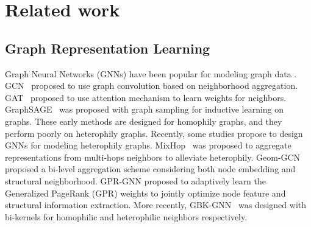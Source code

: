 \documentclass[sigconf]{acmart}
\begin{document}
	\section{Related work}
	\subsection{Graph Representation Learning}
	Graph Neural Networks (GNNs) have been popular for modeling graph data \cite{bi2022mm,yang2021domain,chen2021fast,wang2019tag2gauss,du2022understanding}. GCN~\cite{GCN} proposed to use graph convolution based on neighborhood aggregation.  GAT~\cite{GAT} proposed to use attention mechanism to learn weights for neighbors. GraphSAGE~\cite{GraphSAGE} was proposed with graph sampling for inductive learning on graphs. These early methods are designed for homophily graphs, and they perform poorly on heterophily graphs. Recently, some studies \cite{abu2019mixhop, pei2020geom, h2gcn, chien2020adaptive, du2022gbk} propose to design GNNs for modeling heterophily graphs. MixHop~\cite{abu2019mixhop} was proposed to aggregate representations from multi-hops neighbors to alleviate heterophily. Geom-GCN~\cite{pei2020geom}  proposed a bi-level aggregation scheme considering both node embedding and structural neighborhood.  GPR-GNN\cite{chien2020adaptive} proposed to adaptively learn the Generalized PageRank (GPR) weights to jointly optimize node feature and structural information extraction. More recently, GBK-GNN~\cite{du2022gbk} was designed with bi-kernels for homophilic and heterophilic neighbors respectively.
\end{document}

